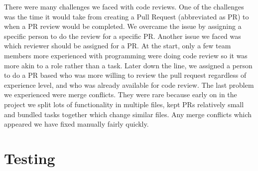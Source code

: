 There were many challenges we faced with code reviews. One of the challenges was the time it would take from creating a Pull Request (abbreviated as PR) to when a PR review would be completed. We overcame the issue by assigning a specific person to do the review for a specific PR. Another issue we faced was which reviewer should be assigned for a PR. At the start, only a few team members more experienced with programming were doing code review so it was more akin to a role rather than a task. Later down the line, we assigned a person to do a PR based who was more willing to review the pull request regardless of experience level, and who was already available for code review. The last problem we experienced were merge conflicts. They were rare because early on in the project we split lots of functionality in multiple files, kept PRs relatively small and bundled tasks together which change similar files. Any merge conflicts which appeared we have fixed manually fairly quickly.\par

\section{Testing}

